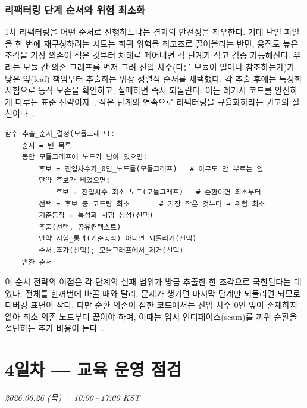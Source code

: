 \subsection{리팩터링 단계 순서와 위험 최소화}
1차 리팩터링을 어떤 순서로 진행하느냐는 결과의 안전성을 좌우한다. 거대 단일 파일을
한 번에 재구성하려는 시도는 회귀 위험을 최고조로 끌어올리는 반면, 응집도 높은 조각을
가장 의존이 적은 것부터 차례로 떼어내면 각 단계가 작고 검증 가능해진다. 우리는 모듈 간
의존 그래프를 먼저 그려 진입 차수(다른 모듈이 얼마나 참조하는가)가 낮은 잎(leaf)
책임부터 추출하는 위상 정렬식 순서를 채택했다. 각 추출 후에는 특성화 시험으로 동작
보존을 확인하고, 실패하면 즉시 되돌린다. 이는 레거시 코드를 안전하게 다루는 표준
전략이자~\cite{feathers2004legacy}, 작은 단계의 연속으로 리팩터링을 규율화하라는
권고의 실천이다~\cite{fowler2018refactoring}.

\begin{verbatim}
함수 추출_순서_결정(모듈그래프):
    순서 = 빈 목록
    동안 모듈그래프에 노드가 남아 있으면:
        후보 = 진입차수가_0인_노드들(모듈그래프)   # 아무도 안 부르는 잎
        만약 후보가 비었으면:
            후보 = 진입차수_최소_노드(모듈그래프)   # 순환이면 최소부터
        선택 = 후보 중 코드량_최소       # 가장 작은 것부터 → 위험 최소
        기준동작 = 특성화_시험_생성(선택)
        추출(선택, 공유컨텍스트)
        만약 시험_통과(기준동작) 아니면 되돌리기(선택)
        순서.추가(선택); 모듈그래프에서_제거(선택)
    반환 순서
\end{verbatim}

이 순서 전략의 이점은 각 단계의 실패 범위가 방금 추출한 한 조각으로 국한된다는 데
있다. 전체를 한꺼번에 바꿀 때와 달리, 문제가 생기면 마지막 단계만 되돌리면 되므로
디버깅 표면이 작다. 다만 순환 의존이 심한 코드에서는 진입 차수 0인 잎이 존재하지 않아
최소 의존 노드부터 끊어야 하며, 이때는 임시 인터페이스(seam)를 끼워 순환을 절단하는
추가 비용이 든다~\cite{martin2008cleancode, mcconnell2004codecomplete}.

\chapter{4일차 — 교육 운영 점검}
\textit{2026.06.26 (목) · 10:00\,--\,17:00 KST}


